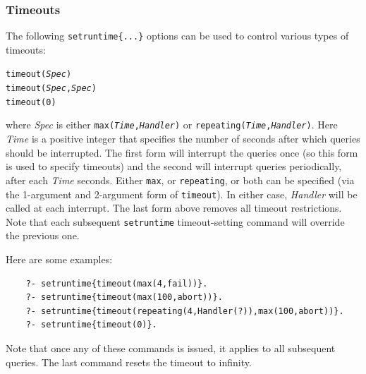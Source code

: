 \documentclass[11pt]{article}
\begin{document}
\subsubsection{Timeouts}
The following \texttt{setruntime\{...\}} options
can be used to control various types of timeouts:
\begin{alltt}
    timeout(\emph{Spec})
    timeout(\emph{Spec},\emph{Spec})
    timeout(0)
\end{alltt}
where \emph{Spec} is  either \texttt{max(\emph{Time},\emph{Handler})} or
\texttt{repeating(\emph{Time},\emph{Handler})}.
Here \emph{Time} is a positive integer that specifies the number of seconds
after which queries should be interrupted. The first form will interrupt
the queries once (so this form is used to specify timeouts) and the
second will interrupt queries periodically, after each \emph{Time} seconds. 
Either \texttt{max}, or \texttt{repeating}, or both can be specified
(via the 1-argument and 2-argument form of \texttt{timeout}).
In either case, \emph{Handler} will be called at each interrupt.
The last form above removes all timeout restrictions.
Note that each subsequent \texttt{setruntime} timeout-setting command 
will override the previous one.

Here are some examples:
\begin{verbatim}
    ?- setruntime{timeout(max(4,fail))}.
    ?- setruntime{timeout(max(100,abort))}.
    ?- setruntime{timeout(repeating(4,Handler(?)),max(100,abort))}.
    ?- setruntime{timeout(0)}.
\end{verbatim}
Note that once any of these commands is issued, it applies to all
subsequent queries.  The last command resets the timeout to infinity.
\end{document}
